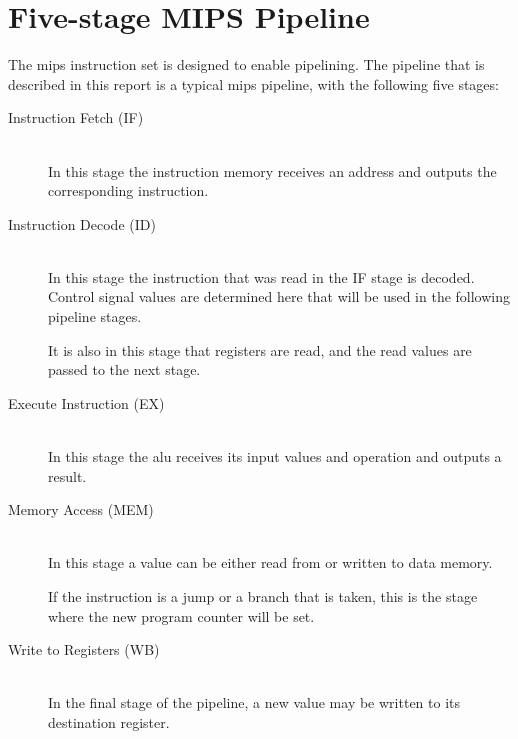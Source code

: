 \section{Five-stage MIPS Pipeline}
The \gls{mips} instruction set is designed to enable pipelining.
The pipeline that is described in this report is a typical \gls{mips} pipeline,
with the following five stages:

\begin{description}
    \item[Instruction Fetch (IF)]
        \hfill\\
        In this stage the instruction memory receives an address and outputs the corresponding instruction.
    \item[Instruction Decode (ID)]
        \hfill\\
        In this stage the instruction that was read in the IF stage is decoded.
        Control signal values are determined here that will be used in the following pipeline stages.

        It is also in this stage that registers are read,
        and the read values are passed to the next stage.
    \item[Execute Instruction (EX)]
        \hfill\\
        In this stage the \gls{alu} receives its input values and operation and outputs a result.
    \item[Memory Access (MEM)]
        \hfill\\
        In this stage a value can be either read from or written to data memory.

        If the instruction is a jump or a branch that is taken,
        this is the stage where the new program counter will be set.
    \item[Write to Registers (WB)]
        \hfill\\
        In the final stage of the pipeline, a new value may be written to its destination register.
\end{description}

